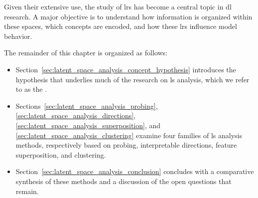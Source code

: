 Given their extensive use, the study of \glspl{lr} has become a central topic in \gls{dl} research.
A major objective is to understand how information is organized within these spaces, which concepts are encoded, and how these \glspl{lr} influence model behavior.

The remainder of this chapter is organized as follows:
\begin{itemize}
    \item Section~\ref{sec:latent_space_analysis_concept_hypothesis} introduces the hypothesis that underlies much of the research on \gls{ls} analysis, which we refer to as the \ConceptHypothesisName.
    \item Sections~\ref{sec:latent_space_analysis_probing}, \ref{sec:latent_space_analysis_directions}, \ref{sec:latent_space_analysis_superposition}, and \ref{sec:latent_space_analysis_clustering} examine four families of \gls{ls} analysis methods, respectively based on probing, interpretable directions, feature superposition, and clustering.
    \item Section~\ref{sec:latent_space_analysis_conclusion} concludes with a comparative synthesis of these methods and a discussion of the open questions that remain.
\end{itemize}






